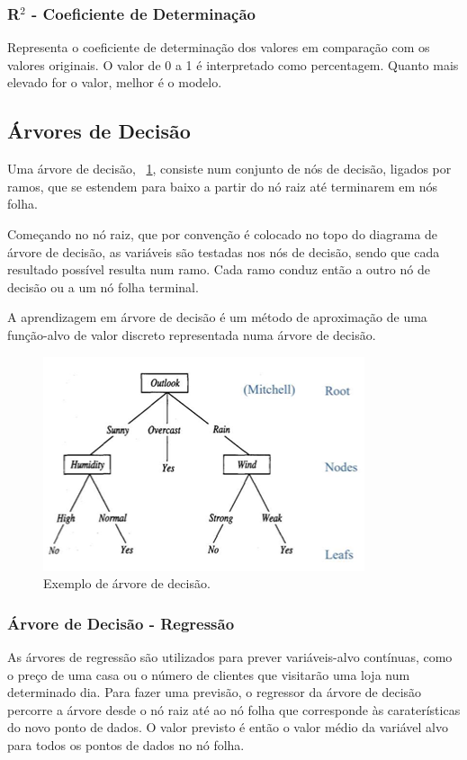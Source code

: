 \documentclass[conference]{IEEEtran}
\begin{document}
\medskip
\subsubsection{R$^2$ - Coeficiente de Determinação}

Representa o coeficiente de determinação dos valores em comparação com os valores originais. O valor de 0 a 1 é interpretado como percentagem. Quanto mais elevado for o valor, melhor é o modelo.\cite{madureira2024cv} 


\subsection{Árvores de Decisão}

Uma árvore de decisão,  \figurename~\ref{fig:Decision_Trees_example},  consiste num conjunto de nós de decisão, ligados por ramos, que se estendem para baixo a partir do nó raiz até terminarem em nós folha. 

Começando no nó raiz, que por convenção é colocado no topo do diagrama de árvore de decisão, as variáveis são testadas nos nós de decisão, sendo que cada resultado possível resulta num ramo. Cada ramo conduz então a outro nó de decisão ou a um nó folha terminal. 

A aprendizagem em árvore de decisão é um método de aproximação de uma função-alvo de valor discreto representada numa árvore de decisão. \cite{madureira2024dt}

\begin{figure}[h]
	\centering
	\includegraphics[width=0.5\linewidth]{Decision_Trees_example}
	\caption{Exemplo de árvore de decisão. \cite{madureira2024dt}}
	\label{fig:Decision_Trees_example}
\end{figure}

\subsubsection{Árvore de Decisão - Regressão}

As árvores de regressão são utilizados para prever variáveis-alvo contínuas, como o preço de uma casa ou o número de clientes que visitarão uma loja num determinado dia. Para fazer uma previsão, o regressor da árvore de decisão percorre a árvore desde o nó raiz até ao nó folha que corresponde às caraterísticas do novo ponto de dados. O valor previsto é então o valor médio da variável alvo para todos os pontos de dados no nó folha. \cite{ohekar_what_2023}
\end{document}
